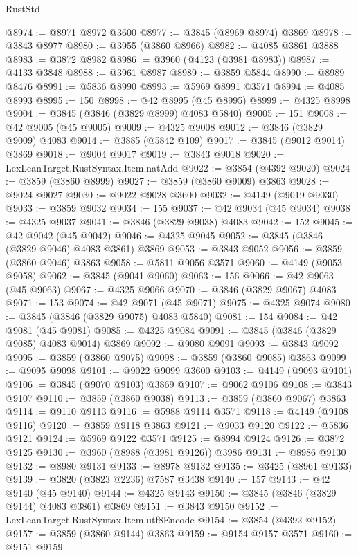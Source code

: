 \begin{lexlean}{RustStd}
\begin{coremodule}
@8974 := @8971 @8972 @3600
@8977 := @3845 (@8969 @8974) @3869
@8978 := @3843 @8977
@8980 := @3955 (@3860 @8966)
@8982 := @4085 @3861 @3888
@8983 := @3872 @8982
@8986 := @3960 (@4123 (@3981 @8983))
@8987 := @4133 @3848
@8988 := @3961 @8987
@8989 := @3859 @5844
@8990 := @8989 @8476
@8991 := @5836 @8990
@8993 := @5969 @8991 @3571
@8994 := @4085 @8993
@8995 := 150
@8998 := @42 @8995 (@45 @8995)
@8999 := @4325 @8998
@9004 := @3845 (@3846 (@3829 @8999) @4083 @5840)
@9005 := 151
@9008 := @42 @9005 (@45 @9005)
@9009 := @4325 @9008
@9012 := @3846 (@3829 @9009) @4083
@9014 := @3885 (@5842 @109)
@9017 := @3845 (@9012 @9014) @3869
@9018 := @9004 @9017
@9019 := @3843 @9018
@9020 := LexLeanTarget.RustSyntax.Item.natAdd
@9022 := @3854 (@4392 @9020)
@9024 := @3859 (@3860 @8999)
@9027 := @3859 (@3860 @9009) @3863
@9028 := @9024 @9027
@9030 := @9022 @9028 @3600
@9032 := @4149 (@9019 @9030)
@9033 := @3859 @9032
@9034 := 155
@9037 := @42 @9034 (@45 @9034)
@9038 := @4325 @9037
@9041 := @3846 (@3829 @9038) @4083
@9042 := 152
@9045 := @42 @9042 (@45 @9042)
@9046 := @4325 @9045
@9052 := @3845 (@3846 (@3829 @9046) @4083 @3861) @3869
@9053 := @3843 @9052
@9056 := @3859 (@3860 @9046) @3863
@9058 := @5811 @9056 @3571
@9060 := @4149 (@9053 @9058)
@9062 := @3845 (@9041 @9060)
@9063 := 156
@9066 := @42 @9063 (@45 @9063)
@9067 := @4325 @9066
@9070 := @3846 (@3829 @9067) @4083
@9071 := 153
@9074 := @42 @9071 (@45 @9071)
@9075 := @4325 @9074
@9080 := @3845 (@3846 (@3829 @9075) @4083 @5840)
@9081 := 154
@9084 := @42 @9081 (@45 @9081)
@9085 := @4325 @9084
@9091 := @3845 (@3846 (@3829 @9085) @4083 @9014) @3869
@9092 := @9080 @9091
@9093 := @3843 @9092
@9095 := @3859 (@3860 @9075)
@9098 := @3859 (@3860 @9085) @3863
@9099 := @9095 @9098
@9101 := @9022 @9099 @3600
@9103 := @4149 (@9093 @9101)
@9106 := @3845 (@9070 @9103) @3869
@9107 := @9062 @9106
@9108 := @3843 @9107
@9110 := @3859 (@3860 @9038)
@9113 := @3859 (@3860 @9067) @3863
@9114 := @9110 @9113
@9116 := @5988 @9114 @3571
@9118 := @4149 (@9108 @9116)
@9120 := @3859 @9118 @3863
@9121 := @9033 @9120
@9122 := @5836 @9121
@9124 := @5969 @9122 @3571
@9125 := @8994 @9124
@9126 := @3872 @9125
@9130 := @3960 (@8988 (@3981 @9126)) @3986
@9131 := @8986 @9130
@9132 := @8980 @9131
@9133 := @8978 @9132
@9135 := @3425 (@8961 @9133)
@9139 := @3820 (@3823 @2236) @7587 @3438
@9140 := 157
@9143 := @42 @9140 (@45 @9140)
@9144 := @4325 @9143
@9150 := @3845 (@3846 (@3829 @9144) @4083 @3861) @3869
@9151 := @3843 @9150
@9152 := LexLeanTarget.RustSyntax.Item.utf8Encode
@9154 := @3854 (@4392 @9152)
@9157 := @3859 (@3860 @9144) @3863
@9159 := @9154 @9157 @3571
@9160 := @9151 @9159

\end{coremodule}
\end{lexlean}

